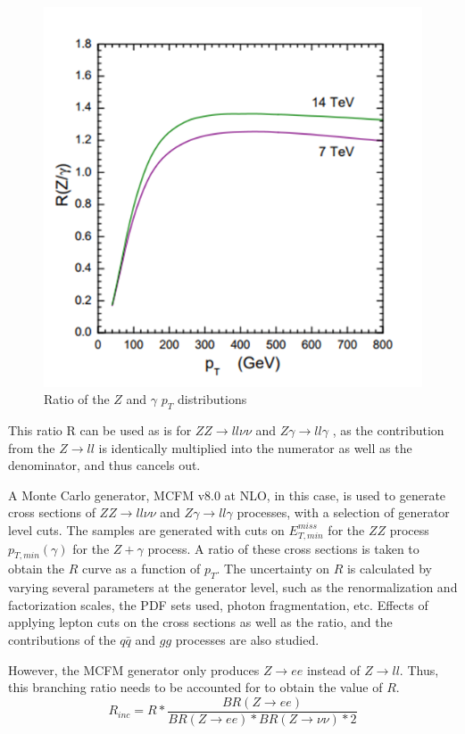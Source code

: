 \documentclass[11pt,a4paper,final]{report}
\newcommand{\ZZ}{$ZZ\rightarrow ll\nu\nu$ }
\newcommand{\Zgam}{$Z\gamma\rightarrow ll\gamma$ }
\begin{document}
\begin{figure}[H]
	\centering
		\includegraphics[scale=0.5]{paper_Rplot.png}
		\caption{Ratio of the $Z$ and $\gamma$ $p_T$ distributions \cite{gammajet}}
\end{figure}
This ratio R can be used as is for \ZZ and \Zgam, as the contribution from the $Z\rightarrow ll$ is identically multiplied into the numerator as well as the denominator, and thus cancels out.

A Monte Carlo generator, MCFM v8.0 \cite{MCFM} at NLO, in this case, is used to generate cross sections of \ZZ and \Zgam processes, with a selection of generator level cuts. The samples are generated with cuts on $E_{T,min}^{miss}$ for the $ZZ$ process $p_{T,min}(\gamma)$ for the $Z+\gamma$ process. A ratio of these cross sections is taken to obtain the $R$ curve as a function of $p_T$. The uncertainty on $R$ is calculated by varying several parameters at the generator level, such as the renormalization and factorization scales, the PDF sets used, photon fragmentation, etc. Effects of applying lepton cuts on the cross sections as well as the ratio, and the contributions of the $q \bar{q}$ and $gg$ processes are also studied.

However, the MCFM generator only produces $Z\rightarrow ee$ instead of $Z\rightarrow ll$. Thus, this branching ratio needs to be accounted for to obtain the value of $R$.
\begin{equation}\label{eq:R_inc}
	R_{inc} = R * \frac{BR(Z\rightarrow ee)}{BR(Z \rightarrow ee)*BR(Z\rightarrow \nu\nu)*2}
\end{equation}
\end{document}
